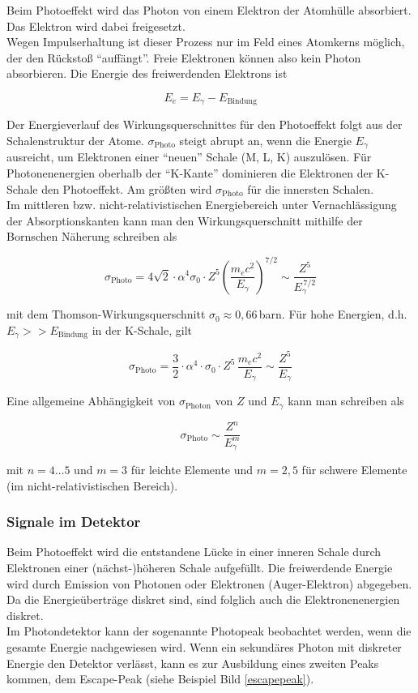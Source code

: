 Beim Photoeffekt wird das Photon von einem Elektron der Atomhülle absorbiert. Das Elektron wird
dabei freigesetzt.
\\
Wegen Impulserhaltung ist dieser Prozess nur im Feld eines Atomkerns möglich, der den Rückstoß 
"`auffängt"'. Freie Elektronen können also kein Photon absorbieren. Die Energie des freiwerdenden
Elektrons ist

\[ E_e=E_\gamma - E_{\text{Bindung}} \]

Der Energieverlauf des Wirkungsquerschnittes für den Photoeffekt folgt aus der Schalenstruktur der
Atome. $\sigma_\text{Photo}$ steigt abrupt an, wenn die Energie $E_\gamma$ ausreicht, um Elektronen
einer "`neuen"' Schale (M, L, K) auszulösen. Für Photonenenergien oberhalb der "`K-Kante"'
dominieren die Elektronen der K-Schale den Photoeffekt. Am größten wird $\sigma_\text{Photo}$ für
die innersten Schalen.
\\
Im mittleren bzw. nicht-relativistischen Energiebereich unter Vernachlässigung der Absorptionskanten
kann man den Wirkungsquerschnitt mithilfe der Bornschen Näherung schreiben als

\[ \sigma_\text{Photo} = 4\sqrt{2} \cdot \alpha^4 \sigma_0 \cdot Z^5 \left(\frac{m_ec^2}{E_\gamma}
\right)^{7/2} \sim \frac{Z^5}{E_\gamma^{\,7/2}} \]

mit dem Thomson-Wirkungsquerschnitt $\sigma_0\approx 0{,}66\,$barn. Für hohe Energien, d.h.
$E_\gamma>>E_{\text{Bindung}}$ in der K-Schale, gilt

\[\sigma_\text{Photo} = \frac{3}{2} \cdot \alpha^4 \cdot\sigma_0 \cdot Z^5\,
\frac{m_ec^2}{E_\gamma} \sim \frac{Z^5}{E_\gamma} \]

Eine allgemeine Abhängigkeit von $\sigma_\text{Photon}$ von $Z$ und $E_\gamma$ kann man schreiben
als

\[ \sigma_\text{Photo} \sim \frac{Z^n}{E_\gamma^m} \]

mit $n=4\ldots5$ und $m=3$ für leichte Elemente und $m=2{,}5$ für schwere Elemente (im
nicht-relativistischen Bereich).

\subsubsection*{Signale im Detektor}

Beim Photoeffekt wird die entstandene Lücke in einer inneren Schale durch Elektronen einer
(nächst-)höheren Schale aufgefüllt. Die freiwerdende Energie wird durch Emission von Photonen oder
Elektronen (Auger-Elektron) abgegeben. Da die Energieüberträge diskret sind, sind folglich auch die
Elektronenenergien diskret. 
\\
Im Photondetektor kann der sogenannte Photopeak beobachtet werden, wenn die gesamte Energie
nachgewiesen wird.  Wenn ein sekundäres Photon mit diskreter Energie den Detektor verlässt, kann
es zur Ausbildung eines zweiten Peaks kommen, dem Escape-Peak (siehe Beispiel Bild
\ref{escapepeak}).

